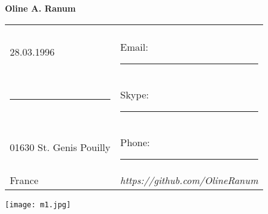 \documentclass[letterpaper,9pt,oneside]{article}
\begin{document}



\vspace{10mm} 
\noindent 
\begin{minipage}{0.5\textwidth}
	 \LARGE{\textbf{Oline A. Ranum}}   \\
	\vspace{4ex} 
	\normalsize
	
	\begin{tabular}{l l}
		    & \hspace{1in}\\
		28.03.1996   & \hspace{0.3in}  Email:  \rule{3cm}{5pt}\\
		\rule{3cm}{5pt}& \hspace{0.3in} Skype: \rule{3cm}{5pt} \\
		01630 St. Genis Pouilly& \hspace{0.3in} Phone:\hspace{3mm} \rule{3cm}{5pt} \\
France				 & \hspace{0.3in} \textit{\small{https://github.com/OlineRanum}}\\
	\end{tabular}
\end{minipage}
\begin{minipage}{0.5\textwidth} \hspace{50mm}
	\texttt{[image: m1.jpg]}
\end{minipage} 
\end{document}
